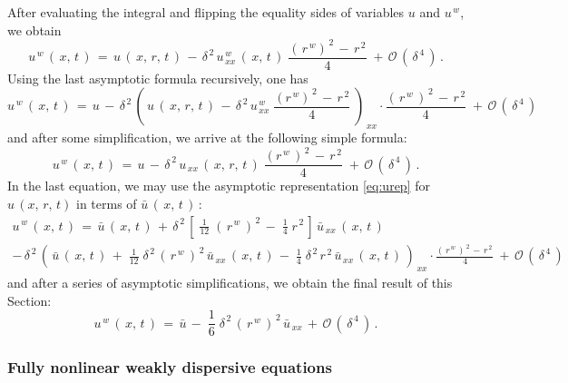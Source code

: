 \documentclass[alpha-refs, 12pt]{wiley-article}
\renewcommand{\O}{\mathcal{O}}
\begin{document}
After evaluating the integral and flipping the equality sides of variables $u$ and $u^{\,w}$, we obtain
\begin{equation*}
  u^{\,w}\,(\,x,\,t\,)\, = \,u\,(\,x,\,r,\,t\,)\,-\,\delta^{\,2}\,u^{\,w}_{\,xx}\,(\,x,\,t\,)\;\frac{(\,r^{\,w})^{\,2}\,-\,r^{\,2}}{4}\; + \,\O\,(\,\delta^{\,4}\,)\,.
\end{equation*}
Using the last asymptotic formula recursively, one has
\begin{equation*}
  u^{\,w}\,(\,x,\,t\,)\,=\,u\,-\,\delta^{\,2}\,\left(\,u\,(\,x,\,r,\,t\,)\,-\,\delta^{\,2}\,u^{\,w}_{\,xx}\;\frac{(r^{\,w})^{\,2}\,-\,r^{\,2}}{4}\;\right)_{\,xx}\cdot\frac{(\,r^{\,w}\,)^{\,2}\,-\,r^{\,2}}{4}\;+\,\O\,(\,\delta^{\,4}\,)
\end{equation*}
and after some simplification, we arrive at the following simple formula:
\begin{equation*}
  u^{\,w}\,(\,x,\,t\,)\,=\,u\,-\,\delta^{\,2}\,u_{\,xx}\,(\,x,\,r,\,t\,)\;\frac{(r^{\,w}\,)^{\,2}\,-\,r^{\,2}}{4}\;+\,\O\,(\,\delta^{\,4}\,)\,.
\end{equation*}
In the last equation, we may use the asymptotic representation \eqref{eq:urep} for $u\,(x,\,r,\,t)$ in terms of $\bar{u}\,(\,x,\,t\,)\,$:
\begin{multline*}
  u^{\,w}\,(\,x,\,t\,)\,=\,\bar{u}\,(\,x,\,t\,)\,+\,\delta^{\,2}\,\left[\;\frac{1}{12}\;(\,r^{\,w}\,)^{\,2}\,-\;\frac{1}{4}\;r^{\,2}\,\right]\,\bar{u}_{\,xx}\,(\,x,\,t\,)\\ 
  -\,\delta^{\,2}\,\left(\,\bar{u}\,(\,x,\,t\,)\, +\;\frac{1}{12}\;\delta^{\,2}\,(\,r^{\,w}\,)^{\,2}\,\bar{u}_{\,xx}\,(\,x,\,t\,)\,-\;\frac{1}{4}\;\delta^{\,2}\,r^{\,2}\,\bar{u}_{\,xx}\,(\,x,\,t\,)\,\right)_{\,xx}\cdot\frac{(\,r^{\,w}\,)^{\,2}\,-\,r^{\,2}}{\,4}\;+\,\O\,(\,\delta^{\,4}\,)
\end{multline*}
and after a series of asymptotic simplifications, we obtain the final result of this Section:
\begin{equation*}
  u^{\,w}\,(\,x,\,t\,)\,=\,\bar{u}\, - 
  \;\frac{1}{6}\;\delta^{\,2}\,(\,r^{\,w}\,)^{\,2}\,\bar{u}_{\,xx}\, + \,\O\,(\,\delta^{\,4}\,)\,.
\end{equation*}

\subsubsection{Fully nonlinear weakly dispersive equations}
\end{document}
